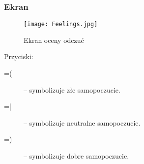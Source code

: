 \subsubsection{Ekran}
\begin{figure}[b!]
  \texttt{[image: Feelings.jpg]}
  \caption{Ekran oceny odczuć}
  \label{HF}
\end{figure}
Przyciski:\\
\begin{description}
  \item[=(] -- symbolizuje złe samopoczucie.
  \item[=|] -- symbolizuje neutralne samopoczucie.
  \item[=)] -- symbolizuje dobre samopoczucie.
\end{description}

